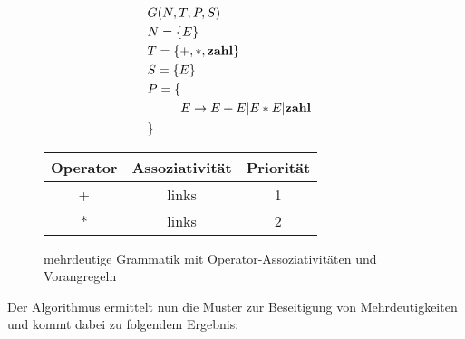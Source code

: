 \documentclass[runningheads]{llncs}
\begin{document}
	\begin{figure}
		\begin{minipage}{0.48\textwidth}
			\begin{flushleft}
				\begin{align*}
					& G(N,T,P,S) \\
					& N = \{E\} \\
					& T = \{+, *, \bold{zahl}\} \\
					& S = \{E\} \\
					& P = \{ \begin{aligned}[t]
						         \\ E & \rightarrow E + E | E * E | \bold{zahl}
					\end{aligned} \\
					& \}
				\end{align*}
			\end{flushleft}
		\end{minipage}
		\hfill
		\begin{minipage}{0.48\textwidth}
			\begin{tabular}{|c|c|c|}
				\hline
				Operator & Assoziativität & Priorität \\
				\hline
				+            & links          & 1         \\
				*            & links          & 2         \\
				\hline
			\end{tabular}
		\end{minipage}
		\caption{mehrdeutige Grammatik mit Operator-Assoziativitäten und Vorangregeln}
		\label{fig:figure7}
	\end{figure}

	Der Algorithmus ermittelt nun die Muster zur Beseitigung von Mehrdeutigkeiten und kommt dabei zu folgendem Ergebnis:
\end{document}
